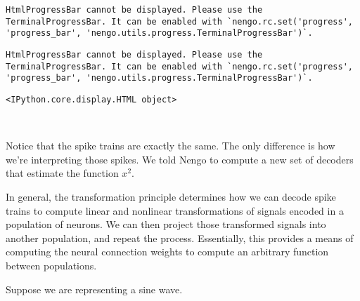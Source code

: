 \documentclass[11pt]{article}
\newcommand{\prompt}[4]{
        \llap{{\color{#2}[#3]: #4}}\vspace{-1.25em}
    }
\begin{document}
    
    \begin{verbatim}
HtmlProgressBar cannot be displayed. Please use the TerminalProgressBar. It can be enabled with `nengo.rc.set('progress', 'progress_bar', 'nengo.utils.progress.TerminalProgressBar')`.
    \end{verbatim}

    
    
    
    
    \begin{verbatim}
HtmlProgressBar cannot be displayed. Please use the TerminalProgressBar. It can be enabled with `nengo.rc.set('progress', 'progress_bar', 'nengo.utils.progress.TerminalProgressBar')`.
    \end{verbatim}

    
    
    
            \begin{tcolorbox}[breakable, boxrule=.5pt, size=fbox, pad at break*=1mm, opacityfill=0]
\prompt{Out}{outcolor}{17}{\hspace{3.5pt}}
\begin{Verbatim}[commandchars=\\\{\}]
<IPython.core.display.HTML object>
\end{Verbatim}
\end{tcolorbox}
        
    \begin{center}
    \end{center}
    { \hspace*{\fill} \\}
    
    Notice that the spike trains are exactly the same. The only difference
is how we're interpreting those spikes. We told Nengo to compute a new
set of decoders that estimate the function \(x^2\).

In general, the transformation principle determines how we can decode
spike trains to compute linear and nonlinear transformations of signals
encoded in a population of neurons. We can then project those
transformed signals into another population, and repeat the process.
Essentially, this provides a means of computing the neural connection
weights to compute an arbitrary function between populations.

Suppose we are representing a sine wave.
\end{document}
